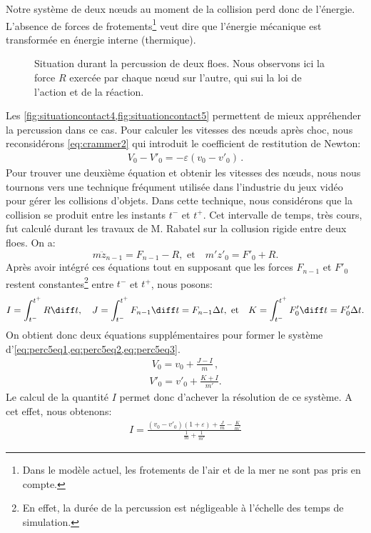 Notre système de deux n\oe{}uds au moment de la collision perd donc de l'énergie. L'absence de forces de frotements\footnote{Dans le modèle actuel, les frotements de l'air et de la mer ne sont pas pris en compte.} veut dire que l'énergie mécanique est transformée en énergie interne (thermique). 
\begin{figure}[!h]
    \centering
    \caption{Situation durant la percussion de deux floes. Nous observons ici la force $R$ exercée par chaque n\oe{}ud sur l'autre, qui sui la loi de l'action et de la réaction.}
    \label{fig:situationcontact5}
\end{figure}
Les \cref{fig:situationcontact4,fig:situationcontact5} permettent de mieux appréhender la percussion dans ce cas. Pour calculer les vitesses des n\oe{}uds après choc, nous reconsidérons \cref{eq:crammer2} qui introduit le coefficient de restitution de Newton:
\begin{align} \label{eq:perc5eq1}
    V_0 - V'_0 = - \varepsilon (v_0 - v'_0) \,.
\end{align}
Pour trouver une deuxième équation et obtenir les vitesses des n\oe{}uds, nous nous tournons vers une technique fréqument utilisée dans l'industrie du jeux vidéo\parencite{hecker1997collision} pour gérer les collisions d'objets. Dans cette technique, nous considérons que la collision se produit entre les instants $t^{-}$ et $t^{+}$. Cet intervalle de temps, très cours, fut calculé durant les travaux de M. Rabatel \parencite[p.87]{rabatel2015thesis} sur la collusion rigide entre deux floes. On a:
$$
m \ddot z_{n-1} = F_{n-1} - R, \text{ et} \quad  m'z'_0 = F'_0 + R.
$$
Après avoir intégré ces équations tout en supposant que les forces $F_{n-1}$ et $F'_0$ restent constantes\footnote{En effet, la durée de la percussion est négligeable à l'échelle des temps de simulation.} entre $t^{-}$ et $t^{+}$, nous posons:
$$
I = \int_{t^{-}}^{t^{+}} R \diff t, \quad  J = \int_{t^{-}}^{t^{+}} F_{n-1} \diff t = F_{n-1} \Delta t, \text{ et} \quad  K = \int_{t^{-}}^{t^{+}} F'_{0} \diff t = F'_{0} \Delta t.
$$
On obtient donc deux équations supplémentaires pour former le système d'\cref{eq:perc5eq1,eq:perc5eq2,eq:perc5eq3}.
\begin{align} \label{eq:perc5eq2}
    V_0 = v_0 + \frac{J-I}{m} \,,
\end{align}
\begin{align} \label{eq:perc5eq3}
    V'_0 = v'_0 + \frac{K+I}{m'}.
\end{align}
Le calcul de la quantité $I$ permet donc d'achever la résolution de ce système. A cet effet, nous obtenons:
\begin{align}
    I = \frac{(v_0 - v'_0)(1+\varepsilon) +\frac{J}{m} - \frac{K}{m'}}{\frac{1}{m}+\frac{1}{m'}}
\end{align}


